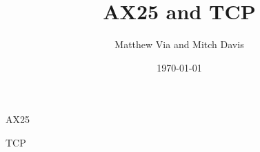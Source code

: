 \documentclass[xcolor=dvipsnames]{beamer}
\begin{document}
\author{Matthew Via and Mitch Davis}
\title{AX25 and TCP}
\date{\today}
\begin{frame}{}
  \titlepage
\end{frame}

\begin{frame}{AX25}

\end{frame}

\begin{frame}{TCP}

\end{frame}
\end{document}
